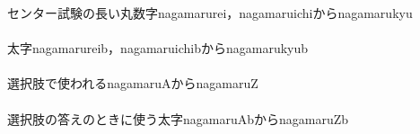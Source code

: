 \documentclass [10pt,fleqn,b5paper]{jsarticlek}
\begin{document}
センター試験の長い丸数字\yy nagamarurei，\yy nagamaruichiから\yy nagamarukyu\\
\nagamarurei
\nagamaruichi
\nagamaruni
\nagamarusan
\nagamarushi
\nagamarugo
\nagamaruroku
\nagamarushichi
\nagamaruhachi
\nagamarukyu\\
太字\yy nagamarureib，\yy nagamaruichibから\yy nagamarukyub\\
\nagamarureib
\nagamaruichib
\nagamarunib
\nagamarusanb
\nagamarushib
\nagamarugob
\nagamarurokub
\nagamarushichib
\nagamaruhachib
\nagamarukyub\\
選択肢で使われる\yy nagamaruAから\yy nagamaruZ\\
\nagamaruA
\nagamaruB
\nagamaruC
\nagamaruD
\nagamaruE
\nagamaruF
\nagamaruG
\nagamaruH
\nagamaruI
\nagamaruJ
\nagamaruK
\nagamaruL
\nagamaruM
\nagamaruN
\nagamaruO
\nagamaruP
\nagamaruQ
\nagamaruR
\nagamaruS
\nagamaruT
\nagamaruU
\nagamaruV
\nagamaruW
\nagamaruX
\nagamaruW
\nagamaruZ\\
選択肢の答えのときに使う太字\yy nagamaruAbから\yy nagamaruZb\\
\nagamaruAb
\nagamaruBb
\nagamaruCb
\nagamaruDb
\nagamaruEb
\nagamaruFb
\nagamaruGb
\nagamaruHb
\nagamaruIb
\nagamaruJb
\nagamaruKb
\nagamaruLb
\nagamaruMb
\nagamaruNb
\nagamaruOb
\nagamaruPb
\nagamaruQb
\nagamaruRb
\nagamaruSb
\nagamaruTb
\nagamaruUb
\nagamaruVb
\nagamaruWb
\nagamaruXb
\nagamaruWb
\nagamaruZb
\end{document}
